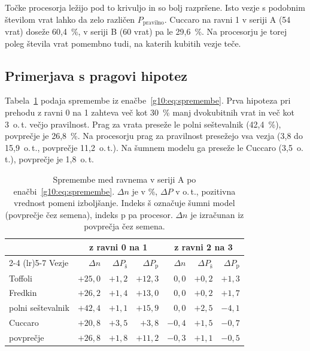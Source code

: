 Točke procesorja ležijo pod to krivuljo in so bolj razpršene.
Isto vezje s podobnim številom vrat
lahko da zelo različen $P_\text{pravilno}$.
Cuccaro na ravni 1 v seriji A (54 vrat)
doseže 60,4~\%,
v seriji B (60 vrat) pa le 29,6~\%.
Na procesorju je torej poleg števila vrat pomembno tudi,
na katerih kubitih vezje teče.


\subsection{Primerjava s pragovi hipotez}
\label{g10:sec:rez_hipoteze}

Tabela~\ref{g10:tab:spremembe} podaja spremembe
iz enačbe~\eqref{g10:eq:spremembe}.
Prva hipoteza pri prehodu z ravni 0 na 1 zahteva
več kot 30~\% manj dvokubitnih vrat
in več kot 3~o.\,t. večjo pravilnost.
Prag za vrata preseže le polni seštevalnik (42,4~\%),
povprečje je 26,8~\%.
Na procesorju prag za pravilnost presežejo vsa vezja
(3,8 do 15,9~o.\,t., povprečje 11,2~o.\,t.).
Na šumnem modelu ga preseže le Cuccaro (3,5~o.\,t.),
povprečje je 1,8~o.\,t.

\begin{table}[htbp]
\caption{Spremembe med ravnema v seriji A
po enačbi~\eqref{g10:eq:spremembe}.
$\Delta n$ je v \%, $\Delta P$ v o.\,t.,
pozitivna vrednost pomeni izboljšanje.
Indeks š označuje šumni model (povprečje čez semena),
indeks p pa procesor.
$\Delta n$ je izračunan iz povprečja čez semena.}
\label{g10:tab:spremembe}
\centering
\small
\setlength{\tabcolsep}{4pt}
\begin{tabular}{lrrrrrr}
\toprule
 & \multicolumn{3}{c}{z ravni 0 na 1} & \multicolumn{3}{c}{z ravni 2 na 3} \\
\cmidrule(lr){2-4} \cmidrule(lr){5-7}
Vezje & $\Delta n$ & $\Delta P_\text{š}$ & $\Delta P_\text{p}$ & $\Delta n$ & $\Delta P_\text{š}$ & $\Delta P_\text{p}$ \\
\midrule
Toffoli & $+25{,}0$ & $+1{,}2$ & $+12{,}3$ & $0{,}0$ & $+0{,}2$ & $+1{,}3$ \\
Fredkin & $+26{,}2$ & $+1{,}4$ & $+13{,}0$ & $0{,}0$ & $+0{,}2$ & $+1{,}7$ \\
polni seštevalnik & $+42{,}4$ & $+1{,}1$ & $+15{,}9$ & $0{,}0$ & $+2{,}5$ & $-4{,}1$ \\
Cuccaro & $+20{,}8$ & $+3{,}5$ & $+3{,}8$ & $-0{,}4$ & $+1{,}5$ & $-0{,}7$ \\
\midrule
povprečje & $+26{,}8$ & $+1{,}8$ & $+11{,}2$ & $-0{,}3$ & $+1{,}1$ & $-0{,}5$ \\
\bottomrule
\end{tabular}
\end{table}

